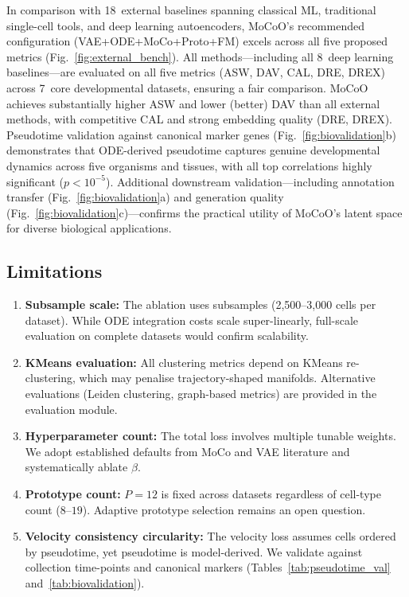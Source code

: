 \documentclass[journal]{IEEEtran}
\begin{document}
In comparison with 18~external baselines spanning classical ML, traditional single-cell tools, and deep learning autoencoders, MoCoO's recommended configuration (VAE+ODE+MoCo+Proto+FM) excels across all five proposed metrics (Fig.~\ref{fig:external_bench}). All methods---including all 8~deep learning baselines---are evaluated on all five metrics (ASW, DAV, CAL, DRE, DREX) across 7~core developmental datasets, ensuring a fair comparison. MoCoO achieves substantially higher ASW and lower (better) DAV than all external methods, with competitive CAL and strong embedding quality (DRE, DREX). Pseudotime validation against canonical marker genes (Fig.~\ref{fig:biovalidation}b) demonstrates that ODE-derived pseudotime captures genuine developmental dynamics across five organisms and tissues, with all top correlations highly significant ($p < 10^{-5}$). Additional downstream validation---including annotation transfer (Fig.~\ref{fig:biovalidation}a) and generation quality (Fig.~\ref{fig:biovalidation}c)---confirms the practical utility of MoCoO's latent space for diverse biological applications.

\subsection{Limitations}
\label{sec:discussion:limitations}

\begin{enumerate}
    \item \textbf{Subsample scale:} The ablation uses subsamples (2{,}500--3{,}000 cells per dataset). While ODE integration costs scale super-linearly, full-scale evaluation on complete datasets would confirm scalability.
    \item \textbf{KMeans evaluation:} All clustering metrics depend on KMeans re-clustering, which may penalise trajectory-shaped manifolds. Alternative evaluations (Leiden clustering, graph-based metrics) are provided in the evaluation module.
    \item \textbf{Hyperparameter count:} The total loss involves multiple tunable weights. We adopt established defaults from MoCo and VAE literature and systematically ablate $\beta$.
    \item \textbf{Prototype count:} $P{=}12$ is fixed across datasets regardless of cell-type count ($8$--$19$). Adaptive prototype selection remains an open question.
    \item \textbf{Velocity consistency circularity:} The velocity loss assumes cells ordered by pseudotime, yet pseudotime is model-derived. We validate against collection time-points and canonical markers (Tables~\ref{tab:pseudotime_val} and~\ref{tab:biovalidation}).
\end{enumerate}
\end{document}

